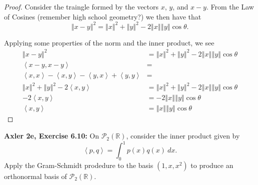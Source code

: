\documentclass{article}
\newcommand{\R}{\mathbb{R}}
\newcommand{\F}{\mathbb{F}}
\newcommand{\abs}[1]{\left| #1 \right|}
\newcommand{\norm}[1]{\left\Vert #1 \right\Vert}
\newcommand{\iprod}[2]{\left\langle #1, #2 \right\rangle}
\begin{document}
\begin{proof}
    Consider the traingle formed by the vectors $x$, $y$, and $x - y$. From the Law of Cosines (remember high school geometry?) we then have that
    $$\norm{x - y}^2 = \norm{x}^2 + \norm{y}^2 - 2 \norm{x} \norm{y} \cos \theta.$$

    Applying some properties of the norm and the inner product, we see
    \begin{align*}
        \norm{x - y}^2 &= \norm{x}^2 + \norm{y}^2 - 2 \norm{x} \norm{y} \cos \theta \\
        \iprod{x-y}{x-y} &= \\
        \iprod{x}{x} - \iprod{x}{y} - \iprod{y}{x} + \iprod{y}{y} &=  \\
        \norm{x}^2 + \norm{y}^2 - 2\iprod{x}{y} &= \norm{x}^2 + \norm{y}^2 - 2 \norm{x} \norm{y} \cos \theta\\
        - 2\iprod{x}{y} &= - 2 \norm{x} \norm{y} \cos \theta\\
        \iprod{x}{y} &= \norm{x} \norm{y} \cos \theta
    \end{align*}
\end{proof}

\newpage %


    




\textbf{Axler 2e, Exercise 6.10: }
On $\mathcal{P}_2(\R)$, consider the inner product given by
$$\iprod{p}{q} = \int_0^1 p(x) q(x) \: dx.$$
Apply the Gram-Schmidt prodedure to the basis $(1, x, x^2)$ to produce an orthonormal basis of $\mathcal{P}_2(\R)$.
\end{document}
